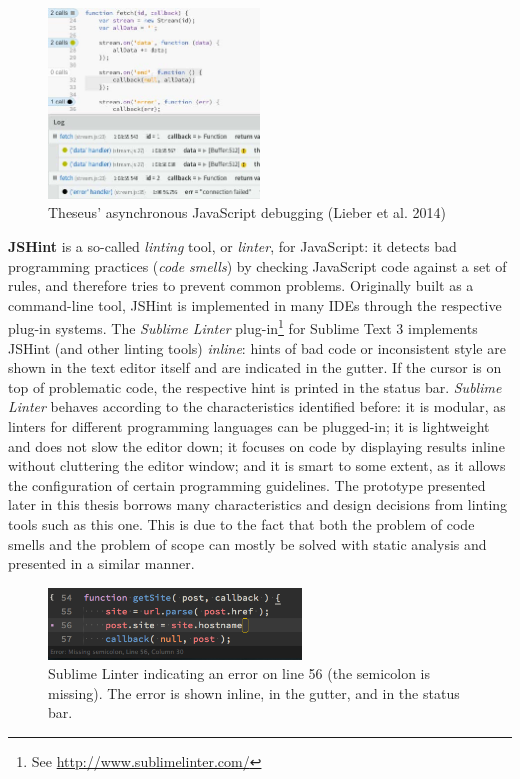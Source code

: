 \begin{figure}[htbp]
\centering
\includegraphics[keepaspectratio,width=0.5\textwidth]{img/theseus.jpg}
\caption{Theseus’ asynchronous JavaScript debugging (Lieber et al. 2014)}
\label{fig:theseus}
\end{figure}

\textbf{JSHint} is a so-called \emph{linting} tool, or \emph{linter},
for JavaScript: it detects bad programming practices (\emph{code
smells}) by checking JavaScript code against a set of rules, and
therefore tries to prevent common problems. Originally built as a
command-line tool, JSHint is implemented in many IDEs through the
respective plug-in systems. The \emph{Sublime Linter} plug-in\footnote{See
  \url{http://www.sublimelinter.com/}} for Sublime Text 3 implements
JSHint (and other linting tools) \emph{inline}: hints of bad code or
inconsistent style are shown in the text editor itself and are indicated
in the gutter. If the cursor is on top of problematic code, the
respective hint is printed in the status bar. \emph{Sublime Linter}
behaves according to the characteristics identified before: it is
modular, as linters for different programming languages can be
plugged-in; it is lightweight and does not slow the editor down; it
focuses on code by displaying results inline without cluttering the
editor window; and it is smart to some extent, as it allows the
configuration of certain programming guidelines. The prototype presented
later in this thesis borrows many characteristics and design decisions
from linting tools such as this one. This is due to the fact that both
the problem of code smells and the problem of scope can mostly be solved
with static analysis and presented in a similar manner.

\begin{figure}[H]
\centering
\includegraphics[keepaspectratio,width=0.6\textwidth]{img/jshint.png}
\caption{Sublime Linter indicating an error on line 56 (the semicolon is missing). The error is shown inline, in the gutter, and in the status bar.}
\label{fig:sublimelinter}
\end{figure}

